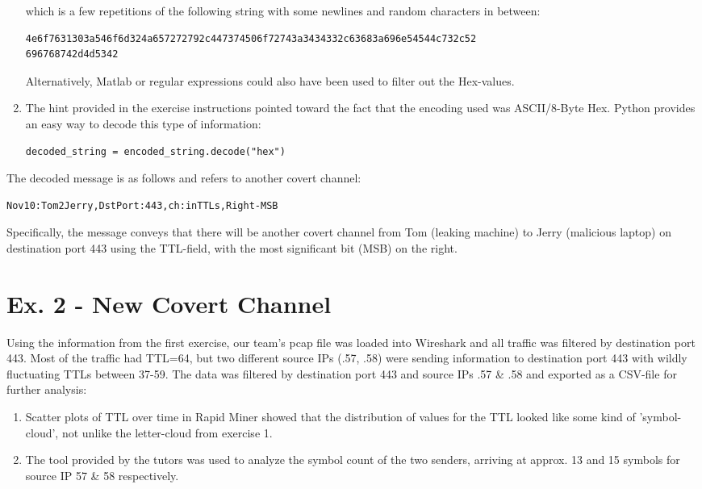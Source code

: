 \documentclass{article}
\begin{document}
\begin{enumerate}
which is a few repetitions of the following string with some newlines and random characters in between:

\begin{verbatim}
4e6f7631303a546f6d324a657272792c447374506f72743a3434332c63683a696e54544c732c52
696768742d4d5342
\end{verbatim}

Alternatively, Matlab or regular expressions could also have been used to filter out the Hex-values.

\item The hint provided in the exercise instructions pointed toward the fact that the encoding used was ASCII/8-Byte Hex. Python provides an easy way to decode this type of information:

\begin{verbatim}
decoded_string = encoded_string.decode("hex")
\end{verbatim}
\end{enumerate}

The decoded message is as follows and refers to another covert channel:
\begin{verbatim}
Nov10:Tom2Jerry,DstPort:443,ch:inTTLs,Right-MSB
\end{verbatim}

Specifically, the message conveys that there will be another covert channel from Tom (leaking machine) to Jerry (malicious laptop) on destination port 443 using the TTL-field, with the most significant bit (MSB) on the right. 




\newpage
\section*{Ex. 2 - New Covert Channel}
Using the information from the first exercise, our team's pcap file was loaded into Wireshark and all traffic was filtered by destination port 443. Most of the traffic had TTL=64, but two different source IPs (.57, .58) were sending information to destination port 443 with wildly fluctuating TTLs between 37-59. The data was filtered by destination port 443 and source IPs .57 \& .58 and exported as a CSV-file for further analysis:
\begin{enumerate}
\item Scatter plots of TTL over time in Rapid Miner showed that the distribution of values for the TTL looked like some kind of 'symbol-cloud', not unlike the letter-cloud from exercise 1.
\item The tool provided by the tutors was used to analyze the symbol count of the two senders, arriving at approx. 13 and 15 symbols for source IP 57 \& 58 respectively.
\end{enumerate}
\end{document}

